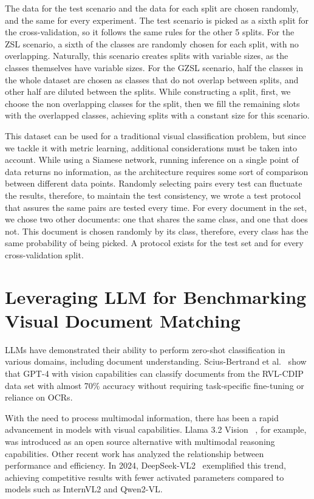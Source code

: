 The data for the test scenario and the data for each split are chosen randomly, and the same for every experiment. The test scenario is picked as a sixth split for the cross-validation, so it follows the same rules for the other 5 splits. For the \gls{ZSL} scenario, a sixth of the classes are randomly chosen for each split, with no overlapping. Naturally, this scenario creates splits with variable sizes, as the classes themselves have variable sizes. For the \gls{GZSL} scenario, half the classes in the whole dataset are chosen as classes that do not overlap between splits, and other half are diluted between the splits. While constructing a split, first, we choose the non overlapping classes for the split, then we fill the remaining slots with the overlapped classes, achieving splits with a constant size for this scenario.

This dataset can be used for a traditional visual classification problem, but since we tackle it with metric learning, additional considerations must be taken into account. While using a Siamese network, running inference on a single point of data returns no information, as the architecture requires some sort of comparison between different data points. Randomly selecting pairs every test can fluctuate the results, therefore, to maintain the test consistency, we wrote a test protocol that assures the same pairs are tested every time. For every document in the set, we chose two other documents: one that shares the same class, and one that does not. This document is chosen randomly by its class, therefore, every class has the same probability of being picked. A protocol exists for the test set and for every cross-validation split.

\section{Leveraging LLM for Benchmarking Visual Document Matching}
\label{sec:method_benchmark}

\glspl{LLM} have demonstrated their ability to perform zero-shot classification in various domains, including document understanding. Scius-Bertrand et al.~\cite{scius2024zeroshot} show that GPT-4 with vision capabilities can classify documents from the RVL-CDIP data set with almost 70\% accuracy without requiring task-specific fine-tuning or reliance on \glspl{OCR}.

With the need to process multimodal information, there has been a rapid advancement in models with visual capabilities. Llama 3.2 Vision ~\cite{meta2024llama3.2}, for example, was introduced as an open source alternative with multimodal reasoning capabilities. Other recent work has analyzed the relationship between performance and efficiency. In 2024, DeepSeek-VL2~\cite{DBLP:journals/corr/abs-2412-10302} exemplified this trend, achieving competitive results with fewer activated parameters compared to models such as InternVL2 and Qwen2-VL.


